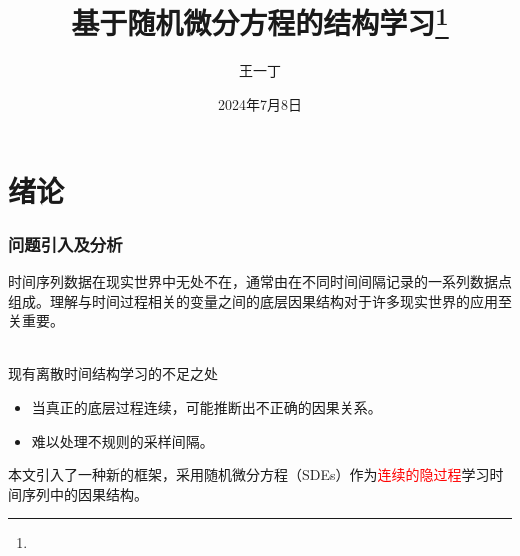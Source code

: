 \documentclass{beamer}
\title[Structure Learning with SDE]{\huge 基于随机微分方程的结构学习\footnote[frame]{\fullcite{wangneural}}}
\subtitle{\large  \rightline{时间序列因果学习的连续建模方法}} %
\author[王一丁]{王一丁} %
\date{2024年7月8日} %
\begin{document}
\itshape
\rmfamily

\begin{frame}
\titlepage %

\end{frame}



\section{绪论} %


\begin{frame}
\frametitle{问题引入及分析}
时间序列数据在现实世界中无处不在，通常由在不同时间间隔记录的一系列数据点组成。理解与时间过程相关的变量之间的底层因果结构对于许多现实世界的应用至关重要。
\\~\\
\begin{block}{现有离散时间结构学习的不足之处}
\begin{itemize}
    \item 当真正的底层过程连续，可能推断出不正确的因果关系。
    \item 难以处理不规则的采样间隔。
\end{itemize}
\end{block}
\vspace{1em}
本文引入了一种新的框架，采用随机微分方程（SDEs）作为\textcolor{red}{连续的隐过程}学习时间序列中的因果结构。
\end{frame}
\end{document}
